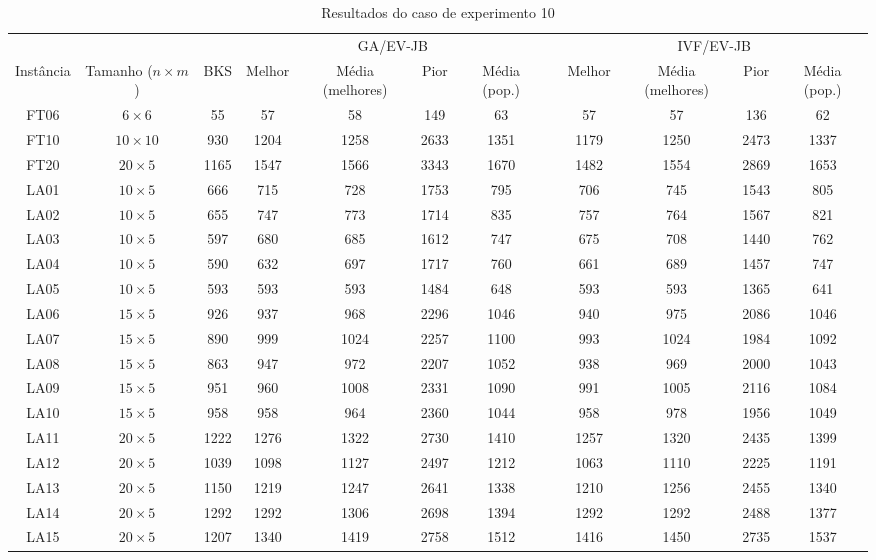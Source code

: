 \begin{sidewaystable}
\caption{Resultados do caso de experimento 10}
\centering
\label{experimento10}
\begin{tabular}{cccccccccccc}
\toprule
& & & \multicolumn{4}{c}{GA/EV-JB} & & \multicolumn{4}{c}{IVF/EV-JB} \\
\cmidrule(c){4-7}
\cmidrule(c){9-12}
Inst\^{a}ncia & Tamanho ($n \times m$) & BKS & Melhor & M\'{e}dia (melhores) & Pior & M\'{e}dia (pop.) & & Melhor & M\'{e}dia (melhores) & Pior & M\'{e}dia (pop.) \\
\midrule
FT06 & $6 \times 6$ & 55 & 57 & 58 & 149 & 63 & & 57 & 57 & 136 & 62 \\
FT10 & $10 \times 10$ & 930 & 1204 & 1258 & 2633 & 1351 & & 1179 & 1250 & 2473 & 1337 \\
FT20 & $20 \times 5$ & 1165 & 1547 & 1566 & 3343 & 1670 & & 1482 & 1554 & 2869 & 1653 \\
LA01 & $10 \times 5$ & 666 & 715 & 728 & 1753 & 795 & & 706 & 745 & 1543 & 805 \\
LA02 & $10 \times 5$ & 655 & 747 & 773 & 1714 & 835 & & 757 & 764 & 1567 & 821 \\
LA03 & $10 \times 5$ & 597 & 680 & 685 & 1612 & 747 & & 675 & 708 & 1440 & 762 \\
LA04 & $10 \times 5$ & 590 & 632 & 697 & 1717 & 760 & & 661 & 689 & 1457 & 747 \\
LA05 & $10 \times 5$ & 593 & 593 & 593 & 1484 & 648 & & 593 & 593 & 1365 & 641 \\
LA06 & $15 \times 5$ & 926 & 937 & 968 & 2296 & 1046 & & 940 & 975 & 2086 & 1046 \\
LA07 & $15 \times 5$ & 890 & 999 & 1024 & 2257 & 1100 & & 993 & 1024 & 1984 & 1092 \\
LA08 & $15 \times 5$ & 863 & 947 & 972 & 2207 & 1052 & & 938 & 969 & 2000 & 1043 \\
LA09 & $15 \times 5$ & 951 & 960 & 1008 & 2331 & 1090 & & 991 & 1005 & 2116 & 1084 \\
LA10 & $15 \times 5$ & 958 & 958 & 964 & 2360 & 1044 & & 958 & 978 & 1956 & 1049 \\
LA11 & $20 \times 5$ & 1222 & 1276 & 1322 & 2730 & 1410 & & 1257 & 1320 & 2435 & 1399 \\
LA12 & $20 \times 5$ & 1039 & 1098 & 1127 & 2497 & 1212 & & 1063 & 1110 & 2225 & 1191 \\
LA13 & $20 \times 5$ & 1150 & 1219 & 1247 & 2641 & 1338 & & 1210 & 1256 & 2455 & 1340 \\
LA14 & $20 \times 5$ & 1292 & 1292 & 1306 & 2698 & 1394 & & 1292 & 1292 & 2488 & 1377 \\
LA15 & $20 \times 5$ & 1207 & 1340 & 1419 & 2758 & 1512 & & 1416 & 1450 & 2735 & 1537 \\
\bottomrule
\end{tabular}
\end{sidewaystable}
